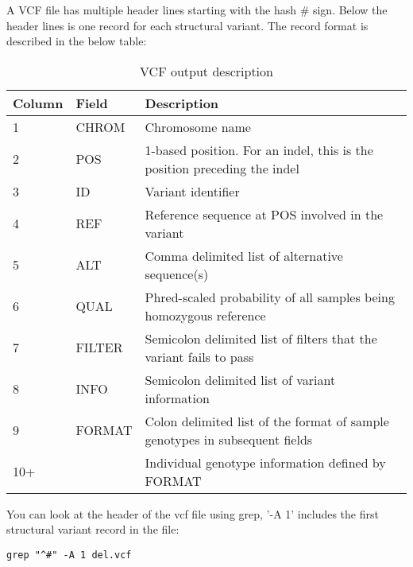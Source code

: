 \begin{information}
A VCF file has multiple header lines starting with the hash \# sign. Below the header lines is one record for each structural variant. The record format is described in the below table:


\begin{table}[H]
  \centering
  \caption{VCF output description}
    \begin{tabular}{lll}
    \toprule
    Column & Field & Description \\
    \midrule
    1 & CHROM & Chromosome name \\
    2 & POS & 1-based position. For an indel, this is the position preceding the indel \\
    3 & ID & Variant identifier \\
    4 & REF & Reference sequence at POS involved in the variant \\
    5 & ALT & Comma delimited list of alternative sequence(s) \\
    6 & QUAL & Phred-scaled probability of all samples being homozygous reference \\
    7 & FILTER & Semicolon delimited list of filters that the variant fails to pass \\
    8 & INFO & Semicolon delimited list of variant information \\
    9 & FORMAT & Colon delimited list of the format of sample genotypes in subsequent fields \\
    10+ & & Individual genotype information defined by FORMAT \\
    \bottomrule
    \end{tabular}
  \label{tab:vcfoutput}
\end{table}


\end{information}
\begin{steps}
You can look at the header of the vcf file using grep, '-A 1' includes the first structural variant record in the file:

\begin{lstlisting}
grep "^#" -A 1 del.vcf
\end{lstlisting}
\end{steps}

